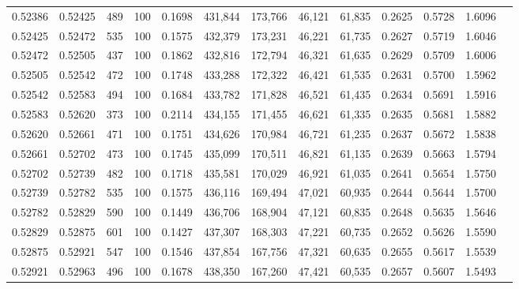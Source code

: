\begin{tabular}{rrrrrrrrrrrrr}
0.52386 & 0.52425 &   489 & 100 &                                     0.1698 & 431,844 & 173,766 &  46,121 &  61,835 & 0.2625 & 0.5728 & 1.6096 \\
0.52425 & 0.52472 &   535 & 100 &                                     0.1575 & 432,379 & 173,231 &  46,221 &  61,735 & 0.2627 & 0.5719 & 1.6046 \\
0.52472 & 0.52505 &   437 & 100 &                                     0.1862 & 432,816 & 172,794 &  46,321 &  61,635 & 0.2629 & 0.5709 & 1.6006 \\
0.52505 & 0.52542 &   472 & 100 &                                     0.1748 & 433,288 & 172,322 &  46,421 &  61,535 & 0.2631 & 0.5700 & 1.5962 \\
0.52542 & 0.52583 &   494 & 100 &                                     0.1684 & 433,782 & 171,828 &  46,521 &  61,435 & 0.2634 & 0.5691 & 1.5916 \\
0.52583 & 0.52620 &   373 & 100 &                                     0.2114 & 434,155 & 171,455 &  46,621 &  61,335 & 0.2635 & 0.5681 & 1.5882 \\
0.52620 & 0.52661 &   471 & 100 &                                     0.1751 & 434,626 & 170,984 &  46,721 &  61,235 & 0.2637 & 0.5672 & 1.5838 \\
0.52661 & 0.52702 &   473 & 100 &                                     0.1745 & 435,099 & 170,511 &  46,821 &  61,135 & 0.2639 & 0.5663 & 1.5794 \\
0.52702 & 0.52739 &   482 & 100 &                                     0.1718 & 435,581 & 170,029 &  46,921 &  61,035 & 0.2641 & 0.5654 & 1.5750 \\
0.52739 & 0.52782 &   535 & 100 &                                     0.1575 & 436,116 & 169,494 &  47,021 &  60,935 & 0.2644 & 0.5644 & 1.5700 \\
0.52782 & 0.52829 &   590 & 100 &                                     0.1449 & 436,706 & 168,904 &  47,121 &  60,835 & 0.2648 & 0.5635 & 1.5646 \\
0.52829 & 0.52875 &   601 & 100 &                                     0.1427 & 437,307 & 168,303 &  47,221 &  60,735 & 0.2652 & 0.5626 & 1.5590 \\
0.52875 & 0.52921 &   547 & 100 &                                     0.1546 & 437,854 & 167,756 &  47,321 &  60,635 & 0.2655 & 0.5617 & 1.5539 \\
0.52921 & 0.52963 &   496 & 100 &                                     0.1678 & 438,350 & 167,260 &  47,421 &  60,535 & 0.2657 & 0.5607 & 1.5493 \\

\end{tabular}
